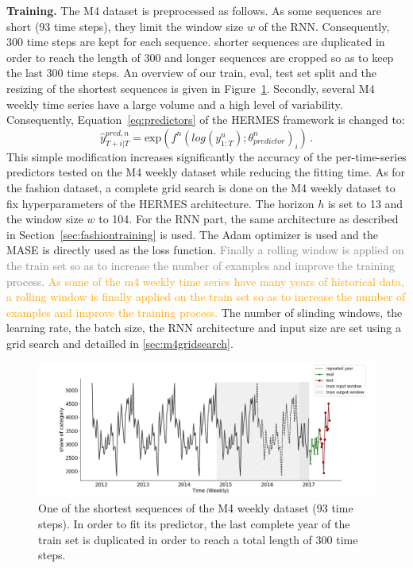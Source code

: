 \documentclass[10pt]{article} %
\newcommand{\ts}{y}
\newcommand{\tspred}{\widehat{\ts}}
\newcommand{\stat}{f}
\newcommand{\statparam}{\theta_{predictor}}
\begin{document}
\textbf{Training. }
The M4 dataset is preprocessed as follows. As some sequences are short (93 time steps), they limit the window size $w$ of the RNN.  
Consequently, 300 time steps are kept for each sequence. shorter sequences are duplicated in order to reach the length of 300 and longer sequences are cropped so as to keep the last 300 time steps. An overview of our train, eval, test set split and the resizing of the shortest sequences is given in Figure~\ref{fig:m4dataset}. Secondly, several M4 weekly time series have a large volume and a high level of variability. Consequently, Equation~\ref{eq:predictors} of the HERMES framework is changed to:
\begin{equation}
    \tspred^{pred,n}_{T+i|T} =\mbox{exp}\left( \stat^n(log\left(\ts^n_{1:T}\right);\statparam^n)_i\right)\,.
\end{equation}
This simple modification increases significantly the accuracy of the per-time-series predictors tested on the M4 weekly dataset while reducing the fitting time. As for the fashion dataset, a complete grid search is done on the M4 weekly dataset to fix hyperparameters of the HERMES architecture. The horizon $h$ is set to 13 and the window size $w$ to 104. For the RNN part, the same architecture as described in Section~\ref{sec:fashiontraining} is used. The Adam optimizer is used and the MASE is directly used as the loss function. \textcolor{gray}{Finally a rolling window is applied on the train set so as to increase the number of examples and improve the training process.} \textcolor{orange}{As some of the m4 weekly time series have many years of historical data, a rolling window is finally applied on the train set so as to increase the number of examples and improve the training process.} The number of slinding windows, the learning rate, the batch size, the RNN architecture and input size are set using a grid search and detailled in \ref{sec:m4gridsearch}.

\begin{figure}
  \centering
    \includegraphics[width=1.\linewidth]{m4_dataset}
  \caption{One of the shortest sequences of the M4 weekly dataset (93 time steps). In order to fit its predictor, the last complete year of the train set is duplicated in order to reach a total length of 300 time steps.}
\label{fig:m4dataset}
\end{figure}
\end{document}
